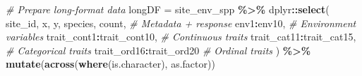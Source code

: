 \documentclass[
]{article}
\newenvironment{Shaded}{\begin{snugshade}}{\end{snugshade}}
\newcommand{\CommentTok}[1]{\textcolor[rgb]{0.56,0.35,0.01}{\textit{#1}}}
\newcommand{\FunctionTok}[1]{\textcolor[rgb]{0.13,0.29,0.53}{\textbf{#1}}}
\newcommand{\NormalTok}[1]{#1}
\newcommand{\OtherTok}[1]{\textcolor[rgb]{0.56,0.35,0.01}{#1}}
\newcommand{\SpecialCharTok}[1]{\textcolor[rgb]{0.81,0.36,0.00}{\textbf{#1}}}
\begin{document}
\begin{Shaded}
\begin{Highlighting}[]
\CommentTok{\# Prepare long{-}format data}
\NormalTok{longDF }\OtherTok{=}\NormalTok{ site\_env\_spp }\SpecialCharTok{\%\textgreater{}\%}
\NormalTok{  dplyr}\SpecialCharTok{::}\FunctionTok{select}\NormalTok{(}
\NormalTok{    site\_id, x, y, species, count,           }\CommentTok{\# Metadata + response}
\NormalTok{    env1}\SpecialCharTok{:}\NormalTok{env10,                              }\CommentTok{\# Environment variables}
\NormalTok{    trait\_cont1}\SpecialCharTok{:}\NormalTok{trait\_cont10,                }\CommentTok{\# Continuous traits}
\NormalTok{    trait\_cat11}\SpecialCharTok{:}\NormalTok{trait\_cat15,                 }\CommentTok{\# Categorical traits}
\NormalTok{    trait\_ord16}\SpecialCharTok{:}\NormalTok{trait\_ord20                  }\CommentTok{\# Ordinal traits}
\NormalTok{  ) }\SpecialCharTok{\%\textgreater{}\%}
  \FunctionTok{mutate}\NormalTok{(}\FunctionTok{across}\NormalTok{(}\FunctionTok{where}\NormalTok{(is.character), as.factor))}


\end{Highlighting}
\end{Shaded}
\end{document}
